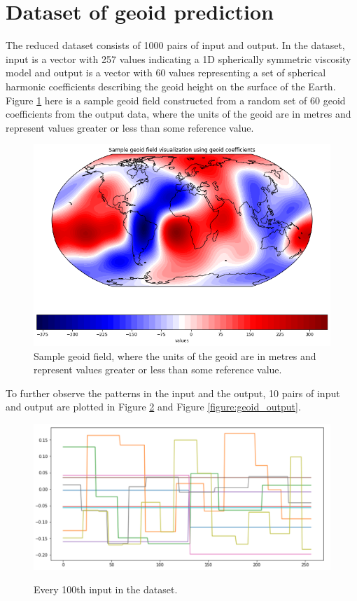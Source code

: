 \section{Dataset of geoid prediction}

The reduced dataset consists of 1000 pairs of input and output. In the dataset, input is a vector with 257 values indicating a 1D spherically symmetric viscosity model and output is a vector with 60 values representing a set of spherical harmonic coefficients describing the geoid height on the surface of the Earth. Figure \ref{figure:geoid_sample} here is a sample geoid field constructed from a random set of 60 geoid coefficients from the output data, where the units of the geoid are in metres and represent values greater or less than some reference value.

\begin{figure}[H]
    \caption{Sample geoid field, where the units of the geoid are in metres and represent values greater or less than some reference value.}
    \label{figure:geoid_sample}
    \includegraphics[scale=0.6]{figures/geoid_images/Geoid_Sample_visualization.png}
\end{figure}

To further observe the patterns in the input and the output, 10 pairs of input and output are plotted in Figure \ref{figure:geoid_input} and Figure \ref{figure:geoid_output}.

\begin{figure}[H]
    \caption{Every 100th input in the dataset.}
    \includegraphics[scale=0.6]{figures/geoid_images/Geoid_sample_input.png}
    \label{figure:geoid_input}
\end{figure}

